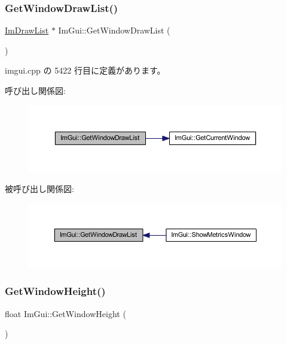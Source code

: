 \subsubsection{\texorpdfstring{Get\+Window\+Draw\+List()}{GetWindowDrawList()}}
{\footnotesize\ttfamily \mbox{\hyperlink{struct_im_draw_list}{Im\+Draw\+List}} $\ast$ Im\+Gui\+::\+Get\+Window\+Draw\+List (\begin{DoxyParamCaption}{ }\end{DoxyParamCaption})}



 imgui.\+cpp の 5422 行目に定義があります。

呼び出し関係図\+:\nopagebreak
\begin{figure}[H]
\begin{center}
\leavevmode
\includegraphics[width=350pt]{namespace_im_gui_aa100c22a9feafe843fa12c66590cbda0_cgraph}
\end{center}
\end{figure}
被呼び出し関係図\+:\nopagebreak
\begin{figure}[H]
\begin{center}
\leavevmode
\includegraphics[width=350pt]{namespace_im_gui_aa100c22a9feafe843fa12c66590cbda0_icgraph}
\end{center}
\end{figure}
\mbox{\label{namespace_im_gui_a44d2bfb80e0d2dd232a553ab29a91b52}} 
\subsubsection{\texorpdfstring{Get\+Window\+Height()}{GetWindowHeight()}}
{\footnotesize\ttfamily float Im\+Gui\+::\+Get\+Window\+Height (\begin{DoxyParamCaption}{ }\end{DoxyParamCaption})}



